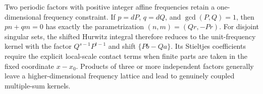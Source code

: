 
Two periodic factors with positive integer affine frequencies retain a
one-dimensional frequency constraint.  If $p=dP$, $q=dQ$, and
$\gcd(P,Q)=1$, then $pn+qm=0$ has exactly the parametrization
$(n,m)=(Qr,-Pr)$.  For disjoint singular sets, the shifted Hurwitz
integral therefore reduces to the unit-frequency kernel with the
factor $Q^{s-1}P^{t-1}$ and shift $\{Pb-Qa\}$.  Its Stieltjes
coefficients require the explicit local-scale contact terms when
finite parts are taken in the fixed coordinate $x-x_0$.
Products of three or more independent factors generally leave a
higher-dimensional frequency lattice and lead to genuinely coupled
multiple-sum kernels.

